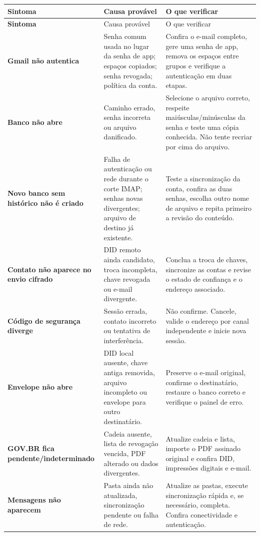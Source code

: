 \documentclass[11pt,a4paper]{article}
\begin{document}
\small
\begin{longtable}{>{\bfseries}p{}p{}p{}}
  \toprule
  Sintoma & Causa provável & O que verificar \\
  \midrule
  \endfirsthead
  \toprule
  Sintoma & Causa provável & O que verificar \\
  \midrule
  \endhead
  Gmail não autentica & Senha comum usada no lugar da senha de app; espaços copiados; senha revogada; política da conta. & Confira o e-mail completo, gere uma senha de app, remova os espaços entre grupos e verifique a autenticação em duas etapas. \\
  Banco não abre & Caminho errado, senha incorreta ou arquivo danificado. & Selecione o arquivo correto, respeite maiúsculas/minúsculas da senha e teste uma cópia conhecida. Não tente recriar por cima do arquivo. \\
  Novo banco sem histórico não é criado & Falha de autenticação ou rede durante o corte IMAP; senhas novas divergentes; arquivo de destino já existente. & Teste a sincronização da conta, confira as duas senhas, escolha outro nome de arquivo e repita primeiro a revisão do conteúdo. \\
  Contato não aparece no envio cifrado & DID remoto ainda candidato, troca incompleta, chave revogada ou e-mail divergente. & Conclua a troca de chaves, sincronize as contas e revise o estado de confiança e o endereço associado. \\
  Código de segurança diverge & Sessão errada, contato incorreto ou tentativa de interferência. & Não confirme. Cancele, valide o endereço por canal independente e inicie nova sessão. \\
  Envelope não abre & DID local ausente, chave antiga removida, arquivo incompleto ou envelope para outro destinatário. & Preserve o e-mail original, confirme o destinatário, restaure o banco correto e verifique o painel de erro. \\
  GOV.BR fica pendente/indeterminado & Cadeia ausente, lista de revogação vencida, PDF alterado ou dados divergentes. & Atualize cadeia e lista, importe o PDF assinado original e confira DID, impressões digitais e e-mail. \\
  Mensagens não aparecem & Pasta ainda não atualizada, sincronização pendente ou falha de rede. & Atualize as pastas, execute sincronização rápida e, se necessário, completa. Confira conectividade e autenticação. \\
  \bottomrule
\end{longtable}
\normalsize
\end{document}
